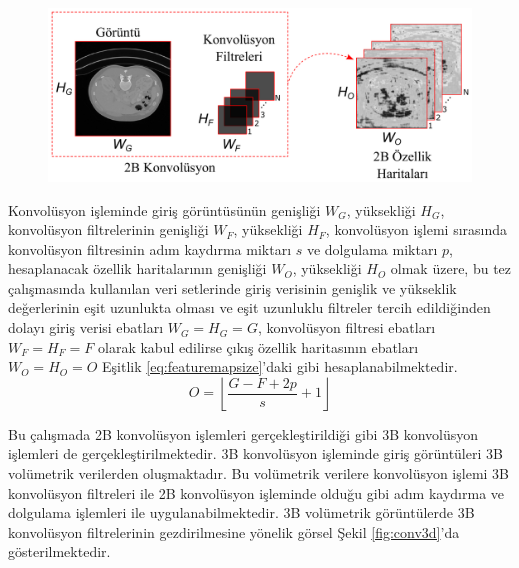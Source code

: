 \begin{figure}[h!]
	\begin{center}
		\vspace{0.4cm}
		{
			\vspace{0.4cm}
			\includegraphics[scale=0.44]{Yapilan-Calismalar/Figures/conv_sizes.pdf}
		}
	\end{center}
\end{figure}

Konvolüsyon işleminde giriş görüntüsünün genişliği $W_{G}$, yüksekliği $H_{G}$, konvolüsyon filtrelerinin genişliği $W_{F}$, yüksekliği $H_{F}$, konvolüsyon işlemi sırasında konvolüsyon filtresinin adım kaydırma miktarı $s$ ve dolgulama miktarı $p$, hesaplanacak özellik haritalarının genişliği $W_{O}$, yüksekliği $H_{O}$ olmak üzere, bu tez çalışmasında kullanılan veri setlerinde giriş verisinin genişlik ve yükseklik değerlerinin eşit uzunlukta olması ve eşit uzunluklu filtreler tercih edildiğinden dolayı giriş verisi ebatları $W_{G}=H_{G}=G$, konvolüsyon filtresi ebatları $W_{F}=H_{F}=F$ olarak kabul edilirse çıkış özellik haritasının ebatları $W_{O}=H_{O}=O$ Eşitlik \ref{eq:featuremapsize}'daki gibi hesaplanabilmektedir.
\begin{equation}
	\label{eq:featuremapsize}
	O=\left\lfloor \frac{G-F+2p}{s}+1 \right\rfloor
\end{equation}

Bu çalışmada 2B konvolüsyon işlemleri gerçekleştirildiği gibi 3B konvolüsyon işlemleri de gerçekleştirilmektedir. 3B konvolüsyon işleminde giriş görüntüleri 3B volümetrik verilerden oluşmaktadır. Bu volümetrik verilere konvolüsyon işlemi 3B konvolüsyon filtreleri ile 2B konvolüsyon işleminde olduğu gibi adım kaydırma ve dolgulama işlemleri ile uygulanabilmektedir. 3B volümetrik görüntülerde 3B konvolüsyon filtrelerinin gezdirilmesine yönelik görsel Şekil \ref{fig:conv3d}'da gösterilmektedir.

